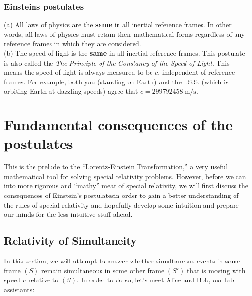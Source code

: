 \documentclass[a4paper,11pt]{article}
\numberwithin{equation}{section}
\begin{document}
 \subsubsection{Einsteins postulates}
 (a) All laws of physics are the \textbf{same} in all inertial reference frames. In other words, all laws of physics must retain their mathematical forms regardless of any reference frames in which they are considered.\smallskip\\
 (b) The speed of light is the \textbf{same} in all inertial reference frames. This postulate is also called the \textit{The Principle of the Constancy of the Speed of Light}. This means the speed of light is always measured to be $c$, independent of reference frames. For example, both you (standing on Earth) and the I.S.S. (which is orbiting Earth at dazzling speeds) agree that $c=\SI{299 792 458}{\meter\per\second}$. 
 
 \newpage 
 
 \section{Fundamental consequences of the postulates} 
 This is the prelude to the ``Lorentz-Einstein Transformation,'' a very useful mathematical tool for solving special relativity problems. However, before we can into more rigorous and ``mathy'' meat of special relativity, we will first discuss the consequences of Einstein's postulates\textemdash in order to gain a better understanding of the rules of special relativity and hopefully develop some intuition and prepare our minds for the less intuitive stuff ahead.  
 \subsection{Relativity of Simultaneity}
 In this section, we will attempt to answer whether simultaneous events in some frame $(S)$ remain simultaneous in some other frame $(S')$ that is moving with speed $v$ relative to $(S)$. In order to do so, let's meet Alice and Bob, our lab assistants:
 \begin{figure}[htb]
 \centering
 \end{figure}
\end{document}
